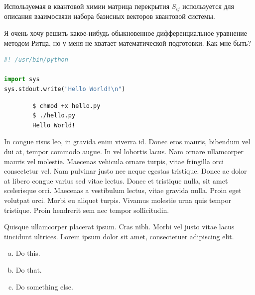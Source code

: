 \documentclass{article}
\begin{document}
\begin{info} %
	Используемая в квантовой химии матрица перекрытия $S_{ij}$ используется для описания взаимосвязи набора базисных векторов квантовой системы.
\end{info}

\newpage
\begin{question}
	Я очень хочу решить какое-нибудь обыкновенное дифференциальное уравнение методом Ритца, но у меня не хватает математической подготовки. Как мне быть?
\end{question}


\newpage

\begin{file}[hello.py]
\begin{lstlisting}[language=Python]
#! /usr/bin/python

import sys
sys.stdout.write("Hello World!\n")
\end{lstlisting}
\end{file}

\begin{commandline}
	\begin{verbatim}
		$ chmod +x hello.py
		$ ./hello.py
		Hello World!
	\end{verbatim}
\end{commandline}

\begin{warn}[Notice:]
  In congue risus leo, in gravida enim viverra id. Donec eros mauris, bibendum vel dui at, tempor commodo augue. In vel lobortis lacus. Nam ornare ullamcorper mauris vel molestie. Maecenas vehicula ornare turpis, vitae fringilla orci consectetur vel. Nam pulvinar justo nec neque egestas tristique. Donec ac dolor at libero congue varius sed vitae lectus. Donec et tristique nulla, sit amet scelerisque orci. Maecenas a vestibulum lectus, vitae gravida nulla. Proin eget volutpat orci. Morbi eu aliquet turpis. Vivamus molestie urna quis tempor tristique. Proin hendrerit sem nec tempor sollicitudin.
\end{warn}

\begin{question}
	Quisque ullamcorper placerat ipsum. Cras nibh. Morbi vel justo vitae lacus tincidunt ultrices. Lorem ipsum dolor sit amet, consectetuer adipiscing elit.

	\begin{enumerate}[(a)]
		\item Do this.
		\item Do that.
		\item Do something else.
	\end{enumerate}
\end{question}
\end{document}
